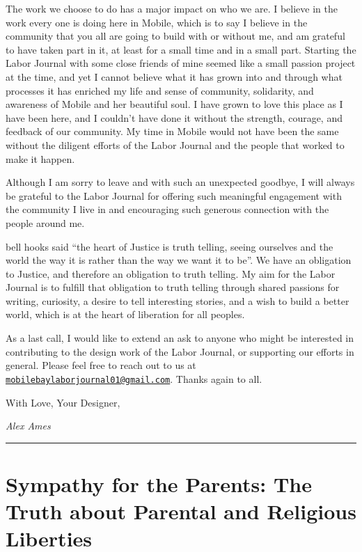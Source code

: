 \documentclass[
]{book}
\begin{document}
The work we choose to do has a major impact on who we are. I believe in the work every one is doing here in Mobile, which is to say I believe in the community that you all are going to build with or without me, and am grateful to have taken part in it, at least for a small time and in a small part. Starting the Labor Journal with some close friends of mine seemed like a small passion project at the time, and yet I cannot believe what it has grown into and through what processes it has enriched my life and sense of community, solidarity, and awareness of Mobile and her beautiful soul. I have grown to love this place as I have been here, and I couldn't have done it without the strength, courage, and feedback of our community. My time in Mobile would not have been the same without the diligent efforts of the Labor Journal and the people that worked to make it happen.

Although I am sorry to leave and with such an unexpected goodbye, I will always be grateful to the Labor Journal for offering such meaningful engagement with the community I live in and encouraging such generous connection with the people around me.

bell hooks said ``the heart of Justice is truth telling, seeing ourselves and the world the way it is rather than the way we want it to be''. We have an obligation to Justice, and therefore an obligation to truth telling. My aim for the Labor Journal is to fulfill that obligation to truth telling through shared passions for writing, curiosity, a desire to tell interesting stories, and a wish to build a better world, which is at the heart of liberation for all peoples.

As a last call, I would like to extend an ask to anyone who might be interested in contributing to the design work of the Labor Journal, or supporting our efforts in general. Please feel free to reach out to us at \href{mailto:mobilebaylaborjournal01@gmail.com}{\nolinkurl{mobilebaylaborjournal01@gmail.com}}. Thanks again to all.

With Love, Your Designer,

\emph{Alex Ames}

\begin{center}\rule{0.5\linewidth}{0.5pt}\end{center}

\section*{Sympathy for the Parents: The Truth about Parental and Religious Liberties}\label{sympathy-for-the-parents-the-truth-about-parental-and-religious-liberties}
\end{document}
